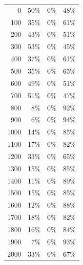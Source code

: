 \begin{table}[t]
\begin{minipage}[t]{0.4\linewidth}
{\begin{tabular}{rrrr}
0	& 50\% &	0\% &	48\% \\
100	& 35\% &	0\% &	61\% \\
200	& 43\% &	0\% &	51\% \\
300	& 53\% &	0\% &	45\% \\
400	& 37\% &	0\% &	61\% \\
500	& 35\% &	0\% &	65\% \\
600	& 49\% &	0\% &	51\% \\
700	& 51\% &	0\% &	47\% \\
800	& 8\% &	0\%	 &92\% \\
900	& 6\% &	0\%	 &94\% \\
1000 &	14\% &	0\%	 & 85\% \\
1100 &	17\% &	0\%	 & 82\% \\
1200 &	33\% &	0\%	 & 65\% \\
1300 &	15\% &	0\% &	85\% \\
1400 &	11\% &	0\% &	89\% \\
1500 &	15\% &	0\% &	85\% \\
1600 &	12\% &	0\% &	88\% \\
1700 &	18\% &	0\% &	82\% \\
1800 &	16\% &	0\% &	84\% \\
1900 &	7\%	&   0\%	 & 93\% \\
2000 &	33\% &	0\% &	67\% \\
\hline
\end{tabular}
}
	\end{minipage}
\end{table}


